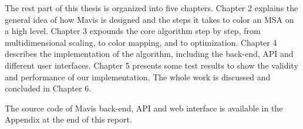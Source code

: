 The rest part of this thesis is organized into five chapters. Chapter 2 explains the general idea of how Mavis is designed and the steps it takes to color an MSA on a high level. Chapter 3 expounds the core algorithm step by step, from multidimensional scaling, to color mapping, and to optimization. Chapter 4 describes the implementation of the algorithm, including the back-end, API and different user interfaces. Chapter 5 presents some test results to show the validity and performance of our implementation. The whole work is discussed and concluded in Chapter 6.

The source code of Mavis back-end, API and web interface is available in the Appendix at the end of this report.
